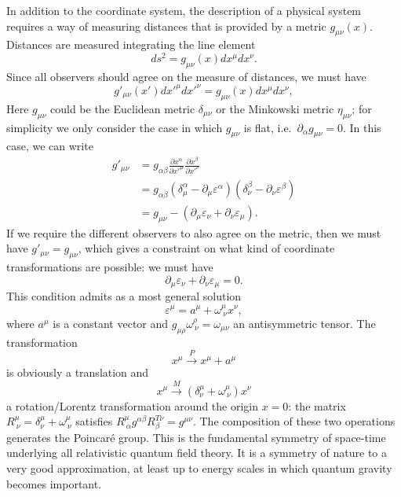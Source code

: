 \documentclass[a4paper,12pt]{article}
\numberwithin{equation}{section}
\begin{document}
In addition to the coordinate system, the description of a physical system requires a way of measuring distances that is provided by a metric $g_{\mu\nu}(x)$. Distances are measured integrating the line element
\begin{equation}
	ds^2 = g_{\mu\nu}(x) dx^\mu dx^\nu.
\end{equation}
Since all observers should agree on the measure of distances, we must have
\begin{equation}
	g'_{\mu\nu}(x') dx'^\mu dx'^\nu = g_{\mu\nu}(x) dx^\mu dx^\nu,
\end{equation}
Here $g_{\mu\nu}$ could be the Euclidean metric $\delta_{\mu\nu}$ or the Minkowski metric $\eta_{\mu\nu}$; for simplicity we only consider the case in which $g_{\mu\nu}$ is flat, i.e.~$\partial_\alpha g_{\mu\nu} = 0$.
In this case, we can write
\begin{equation}
\begin{aligned}
	g'_{\mu\nu} &= g_{\alpha\beta}
	\frac{\partial x^\alpha}{\partial x'^\mu}
	\frac{\partial x^\beta}{\partial x'^\nu}
	\\
	&= g_{\alpha\beta}
	\left( \delta^\alpha_\mu - \partial_\mu \varepsilon^\alpha \right)
	\left( \delta^\beta_\nu - \partial_\nu \varepsilon^\beta \right)
	\\
	&= g_{\mu\nu}
	- \left( \partial_\mu \varepsilon_\nu
	+ \partial_\nu \varepsilon_\mu \right).
\end{aligned}
\end{equation}
If we require the different observers to also agree on the metric, then  we must have $g'_{\mu\nu} = g_{\mu\nu}$, which gives a constraint on what kind of coordinate transformations are possible: we must have
\begin{equation}
	\partial_\mu \varepsilon_\nu
	+ \partial_\nu \varepsilon_\mu = 0.
\end{equation}
This condition admits as a most general solution
\begin{equation}
	\varepsilon^\mu = a^\mu + \omega^\mu_{~\nu} x^\nu,
\end{equation}
where $a^\mu$ is a constant vector and $g_{\mu\rho} \omega^\rho_{~\nu} = \omega_{\mu\nu}$ an antisymmetric tensor.
The transformation
\begin{equation}
	x^\mu \xrightarrow{P} x^\mu + a^\mu
\end{equation}
is obviously a translation and
\begin{equation}
	x^\mu \xrightarrow{M}
	\left( \delta^\mu_\nu + \omega^\mu_{~\nu} \right) x^\nu
\end{equation}
a rotation/Lorentz transformation around the origin $x = 0$: the matrix $R^\mu_{~\nu} = \delta^\mu_\nu + \omega^\mu_{~\nu}$ satisfies $R^\mu_{~\alpha} g^{\alpha\beta} R^{T\nu}_\beta = g^{\mu\nu}$. The composition of these two operations generates the Poincaré group.
This is the fundamental symmetry of space-time underlying all relativistic quantum field theory. It is a symmetry of nature to a very good approximation, at least up to energy scales in which quantum gravity becomes important.
\end{document}
